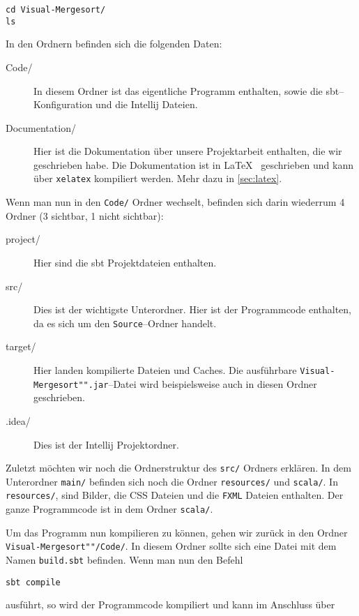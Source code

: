 \begin{verbatim}
cd Visual-Mergesort/
ls
\end{verbatim}

In den Ordnern befinden sich die folgenden Daten:

\begin{description}
\item[Code/] In diesem Ordner ist das eigentliche Programm enthalten, sowie die sbt--Konfiguration und die Intellij Dateien.
\item[Documentation/] Hier ist die Dokumentation über unsere Projektarbeit enthalten, die wir geschrieben habe. Die Dokumentation ist in \LaTeX~ geschrieben und kann über \texttt{xelatex} kompiliert werden. Mehr dazu in \ref{sec:latex}.
\end{description}

Wenn man nun in den \texttt{Code/} Ordner wechselt, befinden sich darin wiederrum 4 Ordner (3 sichtbar, 1 nicht sichtbar):

\begin{description}
\item[project/] Hier sind die sbt Projektdateien enthalten.
\item[src/] Dies ist der wichtigste Unterordner. Hier ist der Programmcode enthalten, da es sich um den \texttt{Source}--Ordner handelt.
\item[target/] Hier landen kompilierte Dateien und Caches. Die ausführbare \texttt{Visual-Mergesort"".jar}--Datei wird beispielsweise auch in diesen Ordner geschrieben.
\item[.idea/] Dies ist der Intellij Projektordner.
\end{description}

Zuletzt möchten wir noch die Ordnerstruktur des \texttt{src/} Ordners erklären. In dem Unterordner \texttt{main/} befinden sich noch die Ordner \texttt{resources/} und \texttt{scala/}. In \texttt{resources/}, sind Bilder, die CSS Dateien und die \texttt{FXML} Dateien enthalten. Der ganze Programmcode ist in dem Ordner \texttt{scala/}.

Um das Programm nun kompilieren zu können, gehen wir zurück in den Ordner \texttt{Visual-Mergesort""/Code/}. In diesem Ordner sollte sich eine Datei mit dem Namen \texttt{build.sbt} befinden. Wenn man nun den Befehl

\begin{verbatim}
sbt compile
\end{verbatim}

ausführt, so wird der Programmcode kompiliert und kann im Anschluss über

